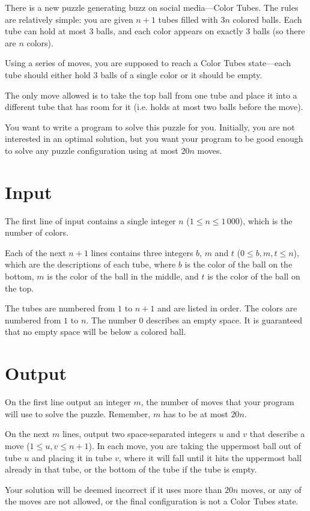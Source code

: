 
There is a new puzzle generating buzz on social
media---Color Tubes.  The rules are relatively simple: you are given
$n+1$ tubes filled with $3n$ colored balls.  Each tube can hold at
most 3 balls, and each color appears on exactly 3 balls (so there are $n$
colors).

Using a series of moves, you are supposed to reach a Color Tubes
state---each tube should either hold 3 balls of a single color or it
should be empty.

The only move allowed is to take the top ball from one tube and place it into a different tube that has room for it (i.e. holds at most two balls before the move).

You want to write a program to solve this puzzle for you.
Initially, you are not interested in an optimal solution, but you want your program to be good enough to solve any puzzle configuration using at most $20n$ moves.

\section*{Input}

The first line of input contains a single integer $n$ ($1 \leq n \leq 1\,000$), which is the number of colors.  

Each of the next $n+1$ lines contains three integers $b$, $m$ and $t$ ($0 \le b,m,t \le n$), which are the descriptions of each tube, where $b$ is the color of the ball on the bottom, $m$ is the color of the ball in the middle, and $t$ is the color of the ball on the top. 

The tubes are numbered from $1$ to $n+1$ and are listed in order. The colors are numbered from $1$ to $n$. The number $0$ describes an
empty space.  It is guaranteed that no empty space will be below a colored ball.

\section*{Output}

On the first line output an integer $m$, the number of moves that your program will use to solve the puzzle. Remember, $m$ has to be at most $20n$.  

On the next $m$ lines, output two space-separated integers $u$ and $v$ that describe a move ($1 \le u,v \le n+1$). In each move, you are taking the uppermost ball out of tube $u$ and placing it in tube $v$, where it will fall until it hits the uppermost ball already in that tube, or the bottom of the tube if the tube is empty.

Your solution will be deemed incorrect if it uses more than
$20n$ moves, or any of the moves are not allowed, or the final configuration is not a Color Tubes state.
